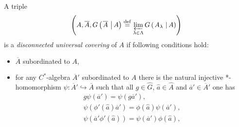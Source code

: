 \documentclass{beamer}
\theoremstyle{plain}
\newcommand{\be}{\begin{equation}}
\newcommand{\ee}{\end{equation}}
\newcommand{\la}{\lambda}
\newcommand{\La}{\Lambda}
\newcommand{\bydef}{\stackrel{\mathrm{def}}{=}}
\newcommand{\hookto}{\hookrightarrow}        %
\begin{document}
\begin{frame}
 \begin{definition}\label{disconnected_infinite_noncommutative_covering_defn}
 	A triple
 	\be\label{disc_triple_eqn}
 \left(A, \overline{A}, G\left(\left.\overline{A}~\right| A\right)\bydef  \varprojlim_{\la\in\La}G\left(\left.A_\la~\right| A\right)\right)
 \ee
	is a \textit{disconnected universal covering} of $A$ if following conditions hold:
\begin{itemize}
	\item $\overline{A}$ subordinated to	$A$,
	\item  for any $C^*$-algebra $\overline{A}'$ subordinated to	$A$  there is the natural injective *-homomorphism
	$\psi : \overline{A}'\hookto\overline{A}$ such that all
	$g \in \widehat{G}$,  $\widehat a \in \widehat{A}$ and $\overline a' \in \overline{A}'$ one has
	\be\label{disconnected_lim_eqn}
	\begin{split}
		g \psi\left( \overline{a}'\right) = \psi\left(g \overline{a}'\right),\\
		\psi\left(\phi'\left( \widehat  a\right)\overline a'  \right) = 	\phi\left( \widehat  a\right)\psi\left( \overline a'  \right),\\
		\psi\left(\overline a' \phi'\left( \widehat  a\right) \right) = 	\psi\left( \overline a'  \right)\phi\left( \widehat  a\right),
	\end{split}
	\ee
\end{itemize}	

\end{definition}
\end{frame}
\end{document}
